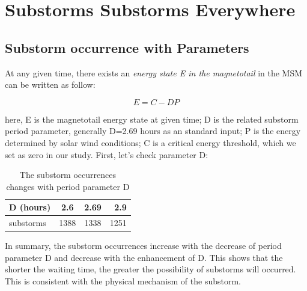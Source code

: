 \documentclass[12pt, letterpaper]{article} %
\begin{document}
\section{Substorms Substorms Everywhere} %
\subsection{Substorm occurrence with Parameters} %
At any given time, there exists an \textit{energy state E in the magnetotail} in the MSM can be written as follow:

\begin{equation} 
  E = C - DP
  \label{eq:1}  
\end{equation} %

here, E is the magnetotail energy state at given time; D is the related substorm period parameter, generally D=2.69 hours as an standard input; P is the energy determined by solar wind conditions; C is a critical energy threshold, which we set as zero in our study. First, let's check parameter D:

\begin{table}[!h] %
  \begin{center} %
  \begin{tabular}{|l|c|c|r|} %
    \hline %
    D (hours) & 2.6 & 2.69 &  2.9\\ %
    \hline %
    \hline %
    substorms & 1388 &1338 & 1251\\ %
    \hline %
  \end{tabular} %
  \caption{The substorm occurrences changes with period parameter D} %
  \label{tab:tab1} %
  \end{center} %
\end{table} %

In summary, the substorm occurrences increase with the decrease of period parameter D and decrease with the enhancement of D. This shows that the shorter the waiting time, the greater the possibility of substorms will occurred. This is consistent with the physical mechanism of the substorm. 
\end{document}
